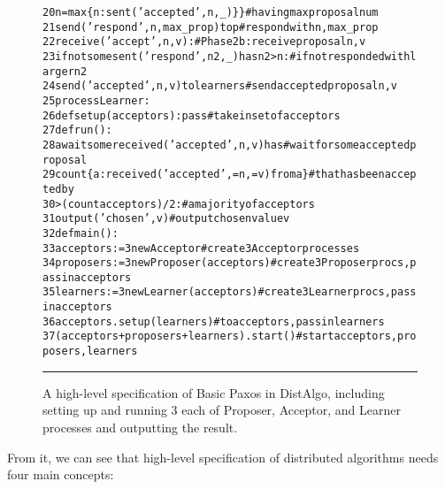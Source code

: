 \documentclass[11pt]{article}
\newenvironment{code}{\begin{alltt}\fontsize{8}{8}\selectfont}{\end{alltt}}
\begin{document}
\begin{figure*}[htbp]
\begin{minipage}[c]{\textwidth}
\begin{code}
\ppdp{}  20                               n = max \{n: sent ('accepted',n,_)\} \}  #  having max proposal num
\ppdp{}  21       send ('respond',n,max_prop) to p                              #  respond with n,max_prop
\ppdp{}  22   receive ('accept',n,v):                                           # Phase 2b: receive proposal n,v
\ppdp{}  23     if not some sent ('respond',n2,_) has n2 > n:                   #  if not responded with larger n2
\ppdp{}  24       send ('accepted',n,v) to learners                             #  send accepted proposal n,v 
\ppdp{}  25 process Learner:
\ppdp{}  26   def setup(acceptors): pass                             # take in set of acceptors
\ppdp{}  27   def run():
\ppdp{}  28     await some received ('accepted',n,v) has                        # wait for some accepted proposal 
\ppdp{}  29                count \{a: received ('accepted',=n,=v) from a\}        # that has been accepted by
\ppdp{}  30                > (count acceptors)/2:                               # a majority of acceptors
\ppdp{}  31       output('chosen',v)                                 # output chosen value v
\ppdp{}  32 def main():
\ppdp{}  33   acceptors := 3 new Acceptor                            # create 3 Acceptor processes
\ppdp{}  34   proposers := 3 new Proposer(acceptors)                 # create 3 Proposer procs, pass in acceptors
\ppdp{}  35   learners := 3 new Learner(acceptors)                   # create 3 Learner procs, pass in acceptors
\ppdp{}  36   acceptors.setup(learners)                              # to acceptors, pass in learners
\ppdp{}  37   (acceptors + proposers + learners).start()             # start acceptors, proposers, learners
\end{code}\ppdp{}
\rule{1\columnwidth}{.1mm}
\end{minipage}
\icdcs{}
\ppdp{}


\caption{\small
    A high-level specification of Basic Paxos in DistAlgo, including
    setting up and running
    3 each of Proposer, Acceptor, and Learner processes and 
    outputting the result.\icdcs{}}
\label{fig-lapaxos-da}
\end{figure*}
From it, we can see that high-level specification of distributed algorithms
needs four main concepts:
\end{document}

